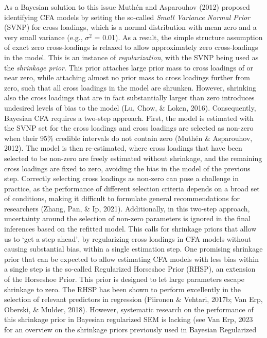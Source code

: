 \documentclass[
  man, donotrepeattitle,floatsintext]{apa6}
\begin{document}
As a Bayesian solution to this issue Muthén and Asparouhov (2012) proposed
identifying CFA models by setting the so-called \emph{Small Variance Normal
Prior} (SVNP) for cross loadings, which is a normal distribution with
mean zero and a very small variance (e.g., \(\sigma^2\) = 0.01). As a result,
the simple structure assumption of exact zero cross-loadings is relaxed
to allow approximately zero cross-loadings in the model. This is
an instance of \emph{regularization}, with the SVNP being used as the
\emph{shrinkage prior}. This prior attaches large
prior mass to cross loadings of or near zero, while attaching almost no
prior mass to cross loadings further from zero, such that all cross
loadings in the model are shrunken. However, shrinking also the cross
loadings that are in fact substantially larger than zero introduces
undesired levels of bias to the model (Lu, Chow, \& Loken, 2016). Consequently,
Bayesian CFA requires a two-step approach. First, the model is estimated
with the SVNP set for the cross loadings and cross loadings are selected
as non-zero when their 95\% credible intervals do not contain zero
(Muthén \& Asparouhov, 2012). The model is then re-estimated, where cross
loadings that have been selected to be non-zero are freely estimated
without shrinkage, and the remaining cross loadings are fixed to zero,
avoiding the bias in the model of the previous step. Correctly selecting
cross loadings as non-zero can pose a challenge in practice, as the
performance of different selection criteria depends on a broad set of
conditions, making it difficult to formulate general recommendations for
researchers (Zhang, Pan, \& Ip, 2021). Additionally, in this two-step
approach, uncertainty around the selection of non-zero parameters is
ignored in the final inferences based on the refitted model. This calls
for shrinkage priors that allow us to `get a step ahead', by
regularizing cross loadings in CFA models without causing substantial
bias, within a single estimation step. One promising shrinkage prior
that can be expected to allow estimating CFA models with less bias
within a single step is the so-called Regularized Horseshoe Prior
(RHSP), an extension of the Horseshoe Prior. This prior is designed to
let large parameters escape shrinkage to zero. The RHSP has been shown
to perform excellently in the selection of relevant predictors in
regression (Piironen \& Vehtari, 2017b; Van Erp, Oberski, \& Mulder, 2018). However,
systematic research on the performance of this shrinkage prior in
Bayesian regularized SEM is lacking (see Van Erp, 2023 for an
overview on the shrinkage priors previously used in Bayesian Regularized
\end{document}

